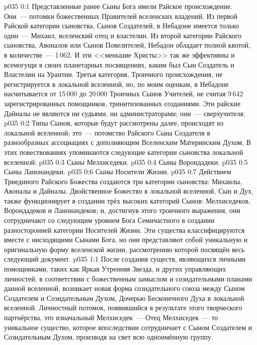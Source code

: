 \author{Глава Архангелов}
\vs p035 0:1 Представленные ранее Сыны Бога имели Райское происхождение. Они~--- потомки божественных Правителей вселенских владений. Из первой Райской категории сыновства, Сынов Создателей, в Небадоне имеется только один~--- Михаил, вселенский отец и властелин. Из второй категории Райского сыновства, Авоналов или Сынов Повелителей, Небадон обладает полной квотой, в количестве~--- 1\,062. И эти <<меньшие Христы>> так же эффективны и всемогущи в своих планетарных посвящениях, каким был Сын Создатель и Властелин на Урантии. Третья категория, Троичного происхождения, не регистрируется в локальной вселенной, но, по моим оценкам, в Небадоне насчитывается от 15\,000 до 20\,000 Троичных Сынов Учителей, не считая 9\,642 зарегистрированных помощников, тринитизованных созданиями. Эти райские Дайналы не являются ни судьями, ни администраторами; они~--- сверхучителя.
\vs p035 0:2 Типы Сынов, которые будут рассмотрены далее, происходят из локальной вселенной; это~--- потомство Райского Сына Создателя в разнообразных ассоциациях с дополняющим Вселенским Материнским Духом. В этих повествованиях упоминаются следующие категории сыновства локальной вселенной:
\vs p035 0:3 Сыны Мелхиседеки.
\vs p035 0:4 Сыны Ворондадеки.
\vs p035 0:5 Сыны Ланонандеки.
\vs p035 0:6 Сыны Носители Жизни.
\vs p035 0:7 \pc Действием Триединого Райского Божества создаются три категории сыновства: Михаилы, Авоналы и Дайналы. Двойственное Божество в локальной вселенной, Сын и Дух, также функционирует в создании трёх высоких категорий Сынов: Мелхиседеков, Ворондадеков и Ланонандеков; и, достигнув этого троичного выражения, они сотрудничают со следующим уровнем Бога Семичастного в создании разносторонней категории Носителей Жизни. Эти существа классифицируются вместе с нисходящими Сынами Бога, но они представляют собой уникальную и оригинальную форму вселенской жизни, рассмотрению которой посвящён весь следующий документ.
\vs p035 1:1 После создания существ, являющихся личными помощниками, таких как Яркая Утренняя Звезда, и других управляющих личностей, в соответствии с божественным замыслом и созидательными планами данной вселенной, возникает новая форма созидательного союза между Сыном Создателем и Созидательным Духом, Дочерью Бесконечного Духа в локальной вселенной. Личностный потомок, появившийся в результате этого творческого партнёрства, это изначальный Мелхиседек~--- Отец Мелхиседек~--- то уникальное существо, которое впоследствии сотрудничает с Сыном Создателем и Созидательным Духом, производя на свет всю одноимённую группу.
